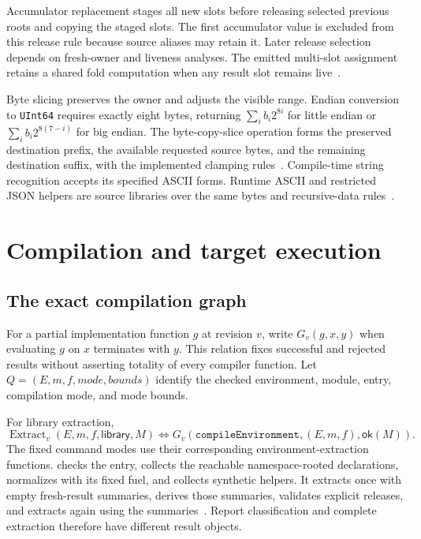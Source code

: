 \documentclass[11pt]{article}
\newcommand{\code}[1]{\texttt{#1}}
\newcommand{\longcode}[1]{\texttt{\seqsplit{#1}}}
\newcommand{\ty}[1]{\mathsf{#1}}
\newcommand{\ok}{\mathsf{ok}}
\begin{document}
Accumulator replacement stages all new slots before releasing selected previous roots and copying the staged slots.  The first accumulator value is excluded from this release rule because source aliases may retain it.  Later release selection depends on fresh-owner and liveness analyses.  The emitted multi-slot assignment retains a shared fold computation when any result slot remains live~\cite{values,binary}.

Byte slicing preserves the owner and adjusts the visible range.  Endian conversion to \code{UInt64} requires exactly eight bytes, returning $\sum_i b_i2^{8i}$ for little endian or $\sum_i b_i2^{8(7-i)}$ for big endian.  The byte-copy-slice operation forms the preserved destination prefix, the available requested source bytes, and the remaining destination suffix, with the implemented clamping rules~\cite{values,binary}.  Compile-time string recognition accepts its specified ASCII forms.  Runtime ASCII and restricted JSON helpers are source libraries over the same bytes and recursive-data rules~\cite{specification}.

\section{Compilation and target execution}

\subsection{The exact compilation graph}

For a partial implementation function $g$ at revision $v$, write $G_v(g,x,y)$ when evaluating $g$ on $x$ terminates with $y$.  This relation fixes successful and rejected results without asserting totality of every compiler function.  Let $Q=(E,m,f,\mathit{mode},\mathit{bounds})$ identify the checked environment, module, entry, compilation mode, and mode bounds.

For library extraction,
\[
\operatorname{Extract}_v(E,m,f,\ty{library},M)
\iff G_v(\code{compileEnvironment},(E,m,f),\ok(M)).
\]
The fixed command modes use their corresponding environment-extraction functions.  \longcode{compileEnvironmentWithEntryModeDetailed} checks the entry, collects the reachable namespace-rooted declarations, normalizes with its fixed fuel, and collects synthetic helpers.  It extracts once with empty fresh-result summaries, derives those summaries, validates explicit releases, and extracts again using the summaries~\cite{extract}.  Report classification and complete extraction therefore have different result objects.
\end{document}
